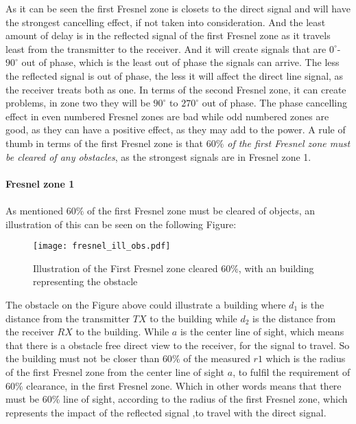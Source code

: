 As it can be seen the first Fresnel zone is closets to the direct signal and will have the strongest cancelling effect, if not taken into consideration. And the least amount of delay is in the reflected signal of the first Fresnel zone as it travels least from the transmitter to the receiver. And it will create signals that are $0^\circ$-$90^\circ$ out of phase, which is the least out of phase the signals can arrive. The less the reflected signal is out of phase, the less it will affect the direct line signal, as the receiver treats both as one. In terms of the second Fresnel zone, it can create problems, in zone two they will be $90^\circ$ to $270^\circ$ out of phase. The phase cancelling effect in even numbered Fresnel zones are bad while odd numbered zones are good, as they can have a positive effect, as they may add to the power. A rule of thumb in terms of the first Fresnel zone is that \textit{$60\%$ of the first Fresnel zone must be cleared of any obstacles}, as the strongest signals are in Fresnel zone 1. 
\\
\\


\textbf{Fresnel zone 1}
\\
\\
As mentioned $60\%$ of the first Fresnel zone must be cleared of objects, an illustration of this can be seen on the following Figure:
\begin{figure}[H]
\centering
\texttt{[image: fresnel\_ill\_obs.pdf]}
\caption{Illustration of the First Fresnel zone cleared $60\%$, with an building representing the obstacle}
\label{dijdk}
\end{figure}

The obstacle on the Figure above could illustrate a building where $d_{1}$ is the distance from the transmitter $TX$ to the building while $d_{2}$ is the distance from the receiver $RX$ to the building. While $a$ is the center line of sight, which means that there is a obstacle free direct view to the receiver, for the signal to travel. So the building must not be closer than $60\%$ of the measured $r1$ which is the radius of the first Fresnel zone from the center line of sight $a$, to fulfil the requirement of $60\%$ clearance, in the first Fresnel zone. Which in other words means that there must be $60\%$ line of sight, according to the radius of the first Fresnel zone, which represents the impact of the reflected signal ,to travel with the direct signal. %

